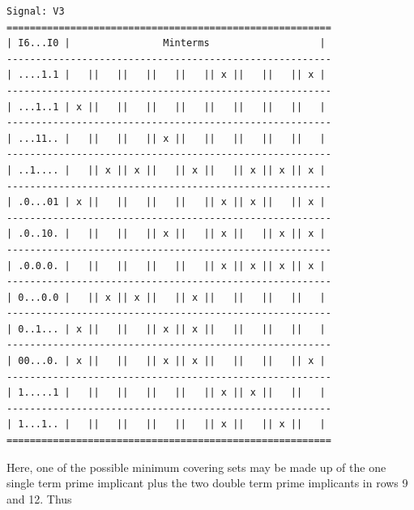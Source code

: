 \documentclass{article}
\begin{document}
\begin{enumerate}
            \begin{scriptsize}
                \begin{verbatim}
Signal: V3
========================================================
| I6...I0 |                Minterms                   |
--------------------------------------------------------
| ....1.1 |   ||   ||   ||   ||   || x ||   ||   || x |
--------------------------------------------------------
| ...1..1 | x ||   ||   ||   ||   ||   ||   ||   ||   |
--------------------------------------------------------
| ...11.. |   ||   ||   || x ||   ||   ||   ||   ||   |
--------------------------------------------------------
| ..1.... |   || x || x ||   || x ||   || x || x || x |
--------------------------------------------------------
| .0...01 | x ||   ||   ||   ||   || x || x ||   || x |
--------------------------------------------------------
| .0..10. |   ||   ||   || x ||   || x ||   || x || x |
--------------------------------------------------------
| .0.0.0. |   ||   ||   ||   ||   || x || x || x || x |
--------------------------------------------------------
| 0...0.0 |   || x || x ||   || x ||   ||   ||   ||   |
--------------------------------------------------------
| 0..1... | x ||   ||   || x || x ||   ||   ||   ||   |
--------------------------------------------------------
| 00...0. | x ||   ||   || x || x ||   ||   ||   || x |
--------------------------------------------------------
| 1.....1 |   ||   ||   ||   ||   || x || x ||   ||   |
--------------------------------------------------------
| 1...1.. |   ||   ||   ||   ||   || x ||   || x ||   |
========================================================
                \end{verbatim}
            \end{scriptsize}

            Here, one of the possible minimum covering sets may be made up of
            the one single term prime implicant plus the two double term prime
            implicants in rows 9 and 12. Thus 

            \pagebreak


\end{enumerate}
\end{document}

